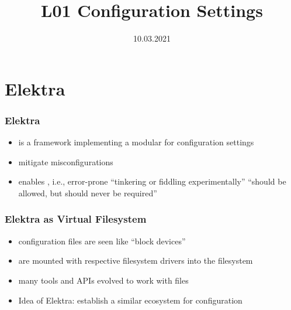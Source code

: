 


\title{L01 Configuration Settings}
\date{10.03.2021}


\section{Elektra}
\begin{frame}
	\frametitle{Elektra~\cite{raab2016elektra}}
	\begin{itemize}[<+->]
		\item \elektra{} is a framework implementing a modular  for configuration settings
		\item {} mitigate misconfigurations
		\item \elektra{} enables  \cite{holland2001nofutz},
			i.e., error-prone \enquote{tinkering or fiddling experimentally} \enquote{should be allowed, but should never be required}
	\end{itemize}
\end{frame}

\begin{frame}
	\frametitle{Elektra as Virtual Filesystem}
	\begin{itemize}
	\item configuration files are seen like ``block devices''
	\item are mounted with respective filesystem drivers into the filesystem
	\item many tools and APIs evolved to work with files
	\item Idea of Elektra: establish a similar ecosystem for configuration
	\end{itemize}
\end{frame}

